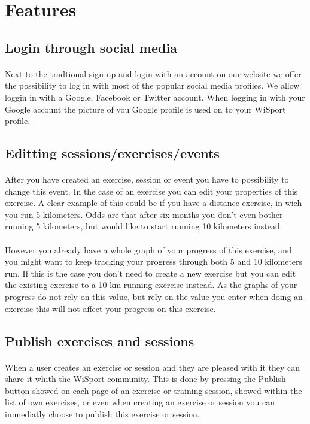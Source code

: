 \documentclass[11pt,a4paper]{scrartcl}
\begin{document}
\section{Features}
\subsection{Login through social media}
\paragraph{}Next to the tradtional sign up and login with an account on our website we offer the possibility to log in with most of the popular social media profiles. We allow loggin in  with a Google, Facebook or Twitter account. When logging in with your Google account the picture of you Google profile is used on to your WiSport profile.

\subsection{Editting sessions/exercises/events}
\paragraph{}After you have created an exercise, session or event you have to possibility to change this event. In the case of an exercise you can edit your properties of this exercise. A clear example of this could be if you have a distance exercise, in wich you run 5 kilometers. Odds are that after six months you don't even bother running 5 kilometers, but would like to start running 10 kilometers instead.
\paragraph{}However you already have a whole graph of your progress of this exercise, and you might want to keep tracking your progress through both 5 and 10 kilometers run. If this is the case you don't need to create a new exercise but you can edit the existing exercise to a 10 km running exercise instead. As the graphs of your progress do not rely on this value, but rely on the value you enter when doing an exercise this will not affect your progress on this exercise.
\subsection{Publish exercises and sessions}
\paragraph{}When a user creates an exercise or session and they are pleased with it they can share it whith the WiSport community. This is done by pressing the Publish button showed on each page of an exercise or training session, showed within the list of own exercises, or even when creating an exercise or session you can immediatly choose to publish this exercise or session.
\end{document}

